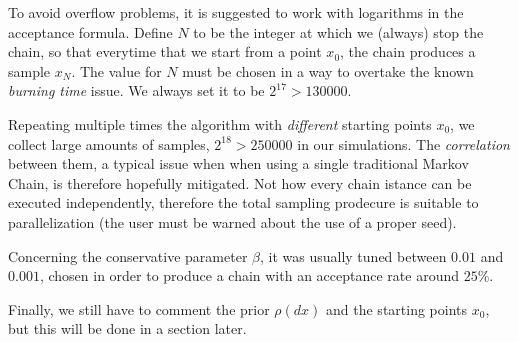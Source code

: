\documentclass[8pt]{article}
\begin{document}
To avoid overflow problems, it is suggested to work with
logarithms in the acceptance formula. Define
$N$ to be the integer at which we (always) stop the chain,
so that everytime that we start from a point $x_0$,
the chain produces a sample
$x_N$. The value for $N$ must
be chosen in a way to overtake the known \emph{burning time} issue.
We always set it to be $2^{17} > 130000$.


Repeating multiple times the algorithm with \emph{different} starting points
$x_0$,
we collect large amounts of samples, $2^{18} > 250000$ in our simulations.
The \emph{correlation} between them, a typical issue when
when using a single traditional Markov Chain,
is therefore hopefully mitigated.
Not how every chain istance can be executed independently,
therefore the total sampling prodecure 
is suitable to parallelization
(the user must be warned about the use of a proper seed).


Concerning the conservative parameter $\beta$, it was usually tuned between
$0.01$ and $0.001$, chosen in order to produce a chain with
an acceptance rate around $25\%$.


Finally, we still have to comment the prior $\rho(dx)$ and
the starting points $x_0$, but this will be done in a section later.

\end{document}
